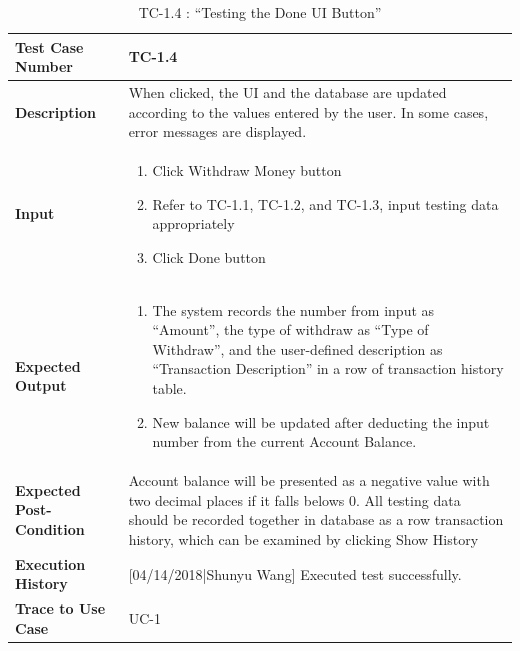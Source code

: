 \documentclass[12pt]{article}
\begin{document}
\begin{table}[H]
\caption{TC-1.4 : “Testing the Done UI Button”}
\begin{center}
\begin{tabular}{|p{5.5	cm}|p{11cm}|}
\hline
\bf Test Case Number & 
TC-1.4 \\
\hline
\bf Description & 
When clicked, the UI and the database are updated according to the values entered by the user. In some cases, error messages are displayed.\\
\hline
\bf Input & 
\begin{enumerate}
  \item Click Withdraw Money button
  \item Refer to TC-1.1, TC-1.2, and TC-1.3, input testing data appropriately
  \item Click Done button
\end{enumerate} \\
\hline
\bf Expected Output & 
\begin{enumerate}
  \item The system records the number from input as “Amount”, the type of withdraw as “Type of Withdraw”, and the user-defined description as “Transaction Description” in a row of transaction history table.
  \item New balance will be updated after deducting the input number from the current Account Balance.
\end{enumerate} \\
\hline
\bf Expected Post-Condition & 
Account balance will be presented as a negative value with two decimal places if it falls belows 0. All testing data should be recorded together  in database as a row transaction history, which can be examined by clicking Show History\\
\hline
\bf Execution History & 
[04/14/2018|Shunyu Wang] Executed test successfully.\\
\hline
\bf Trace to Use Case & 
UC-1\\
\hline

\end{tabular}
\end{center}
\end{table}
\end{document}
